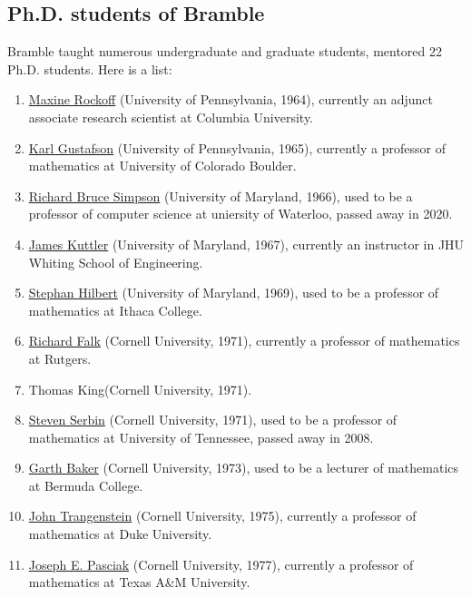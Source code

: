 \documentclass[CJK,11pt]{amsart}
\theoremstyle{definition}
\begin{document}
\begin{CJK*}{UTF8}{gbsn}
\subsection{Ph.D. students of Bramble}
Bramble taught numerous undergraduate and graduate students, mentored
22 Ph.D. students. Here is a list:
% 
\begin{enumerate}
\item
  \href{https://www.linkedin.com/in/maxine-rockoff-394b114/}{Maxine
    Rockoff} (University of Pennsylvania, 1964), currently an adjunct associate research scientist at Columbia University.
\item \href{http://euclid.colorado.edu/~gustafs/}{Karl Gustafson} (University of Pennsylvania, 1965), currently a professor of mathematics at University of Colorado Boulder.
\item \href{https://cs.uwaterloo.ca/~rbsimpso/RBScv.pdf}{Richard Bruce
    Simpson} (University of Maryland, 1966), used to be a professor of computer science at uniersity of Waterloo, passed away in 2020.
\item \href{https://ep.jhu.edu/faculty/james-kuttler/}{James Kuttler} (University of Maryland, 1967), currently an instructor in JHU Whiting School of Engineering.
\item \href{https://en.wikipedia.org/wiki/Stephen_Hilbert}{Stephan
    Hilbert} (University of Maryland, 1969), used to be a professor of mathematics at Ithaca College.
\item \href{https://sites.math.rutgers.edu/~falk/}{Richard Falk} (Cornell University, 1971), currently a professor of mathematics at Rutgers.
\item Thomas King(Cornell University, 1971).
\item
  \href{https://www.legacy.com/us/obituaries/knoxnews/name/steven-serbin-obituary?pid=120620923}{Steven
    Serbin} (Cornell University, 1971), used to be a professor of mathematics at University of Tennessee, passed away in 2008.
\item
  \href{http://www.math.buffalo.edu/mad/PEEPS/baker_gartha.html}{Garth
    Baker} (Cornell University, 1973), used to be a lecturer of mathematics at Bermuda College.
\item \href{https://services.math.duke.edu/~johnt/}{John Trangenstein}
  (Cornell University, 1975), currently a professor of mathematics at Duke University.
\item \href{https://www.math.tamu.edu/~joe.pasciak/}{Joseph
    E. Pasciak} (Cornell University, 1977), currently a professor of mathematics at Texas A\&M University.

\end{enumerate}
\end{CJK*}
\end{document}
